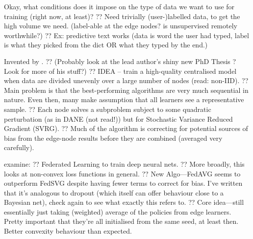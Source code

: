 Okay, what conditions does it impose on the type of data we want to use for training (right now, at least)?
?? Need trivially (user-)labelled data, to get the high volume we need. (label-able at the edge nodes? is unsupervised remotely worthwhile?)
?? Ex: predictive text works (data is word the user had typed, label is what they picked from the dict OR what they typed by the end.)

Invented by \textcite{DBLP:journals/corr/KonecnyMRR16}.
?? (Probably look at the lead author's shiny new PhD Thesis \cite{DBLP:journals/corr/Konecny17}? Look for more of his stuff?)
?? IDEA -- train a high-quality centralised model when data are divided unevenly over a large number of nodes (read: non-IID).
?? Main problem is that the best-performing algorithms are very much sequential in nature. Even then, many make assumption that all learners see a representative sample.
?? Each node solves a subproblem subject to some quadratic perturbation (as in DANE \cite{DBLP:conf/icml/ShamirS014} (not read!)) but for Stochastic Variance Reduced Gradient (SVRG).
?? Much of the algorithm is correcting for potential sources of bias from the edge-node results before they are combined (averaged very carefully).

\textcite{DBLP:conf/aistats/McMahanMRHA17} examine:
?? Federated Learning to train deep neural nets.
?? More broadly, this looks at non-convex loss functions in general.
?? New Algo---FedAVG seems to outperform FedSVG despite having fewer terms to correct for bias. I've written that it's analogous to dropout (which itself can offer behaviour close to a Bayesian net), check again to see what exactly this refers to.
?? Core idea---still essentially just taking (weighted) average of the policies from edge learners. Pretty important that they're all initialised from the same seed, at least then. Better convexity behaviour than expected.

